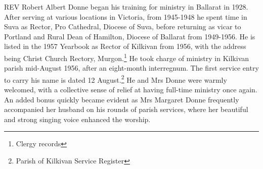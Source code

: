 \lettrine[lines=3]{R}{EV}
 Robert Albert Donne began his training for ministry in Ballarat in 1928. After serving at various locations in Victoria, from 1945-1948 he spent time in Suva as Rector, Pro Cathedral, Diocese of Suva, before returning as vicar to Portland and Rural Dean of Hamilton, Diocese of Ballarat from 1949-1956. He is listed in the 1957 Yearbook as Rector of Kilkivan from 1956, with the address being Christ Church Rectory, Murgon.\footnote{Clergy records} He took charge of ministry in Kilkivan parish mid-August 1956, after an eight-month interregnum. The first service entry to carry his name is dated 12 August.\footnote{Parish of Kilkivan Service Register} He and Mrs Donne were warmly welcomed, with a collective sense of relief at having full-time ministry once again. An added bonus quickly became evident as Mrs Margaret Donne frequently accompanied her husband on his rounds of parish services, where her beautiful and strong singing voice enhanced the worship.








